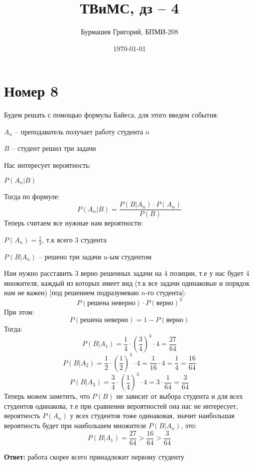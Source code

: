 \documentclass[a4paper,12pt]{article}
\author{Бурмашев Григорий, БПМИ-208}
\title{ТВиМС, дз -- 4}
\date{\today}
\begin{document}
\maketitle 
\clearpage
\section*{Номер 8}
Будем решать с помощью формулы Байеса, для этого введем события:
\begin{center}
$A_n$ -- преподаватель получает работу студента $n$
\end{center}
\begin{center}
$B$ -- студент решил три задачи
\end{center}
Нас интересует вероятность:
\begin{center}
$P(A_n | B) $
\end{center}
Тогда по формуле:
\[
P(A_n | B) = \frac{P(B | A_n) \cdot P(A_n)}{P(B)}
\]
Теперь считаем все нужные нам вероятности:
\begin{center}
$P(A_n) = \frac{1}{3}$, т.к всего 3 студента
\end{center}
\begin{center}
$P(B|A_n)$ -- решено три задачи n-ым студентом
\end{center}
Нам нужно расставить 3 верно решенных задачи на 4 позиции, т.е у нас будет 4 множителя, каждый из которых имеет вид (т.к все задачи одинаковые и порядок нам не важен) [под решением подразумеваю $n$-го студента]:
\[
P(\text{решена неверно}) \cdot P(\text{верно})^3
\]
При этом:
\[
P(\text{решена неверно}) = 1 - P(\text{верно})
\]
Тогда:
\[
P(B|A_1) = \frac{1 }{4} \cdot \left(\frac{3}{4} \right)^3 \cdot 4 = \frac{27}{64}
\]
\[
P(B|A_2) = \frac{1}{2} \cdot \left(\frac{1}{2}\right)^3 \cdot 4 =  \frac{1}{16} \cdot 4 = \frac{1}{4} = \frac{16}{64}\]
\[
P(B|A_3) = \frac{3}{4} \cdot \left(\frac{1}{4}\right)^3 \cdot 4 = 3 \cdot \frac{1}{64} = \frac{3}{64}
\]
Теперь можем заметить, что $P(B)$ не зависит от выбора студента и для всех студентов одинакова, т.е при сравнении вероятностей она нас не интересует, вероятность $P(A_n)$ у всех студентов тоже одинаковая, значит наибольшая вероятность будет при наибольшем множителе $P(B|A_n)$, это:
\[
P(B|A_1) = \frac{27}{64} > \frac{16}{64} > \frac{3}{64}
\]
\begin{center}
\textbf{Ответ: } работа скорее всего принадлежит первому студенту
\end{center}
\clearpage
\end{document}
